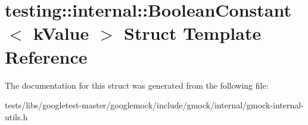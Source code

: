 \hypertarget{structtesting_1_1internal_1_1BooleanConstant}{}\section{testing\+:\+:internal\+:\+:Boolean\+Constant$<$ k\+Value $>$ Struct Template Reference}
\label{structtesting_1_1internal_1_1BooleanConstant}


The documentation for this struct was generated from the following file\+:\begin{DoxyCompactItemize}
\item 
tests/libs/googletest-\/master/googlemock/include/gmock/internal/gmock-\/internal-\/utils.\+h\end{DoxyCompactItemize}
